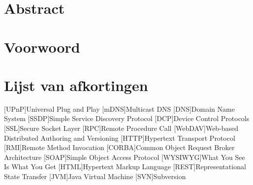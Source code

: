 %
%

\maketitle
{}


%
%

\chapter*{Abstract}
\label{chap:abstract}

%
%

\chapter*{Voorwoord}
\label{chap:voorwoord}


%
%

\setlength\cftpartnumwidth{2em}

\newpage

\label{chap:inhoudstafel}
\tableofcontents

\newpage



%
%

\listoffigures


%
%

\chapter*{Lijst van afkortingen}
\label{chap:afkortingen}

\begin{acronym}[WYSIWYG]	%

[UPnP]{Universal Plug and Play}
[mDNS]{Multicast DNS}
[DNS]{Domain Name System}
[SSDP]{Simple Service Discovery Protocol}
[DCP]{Device Control Protocols}
[SSL]{Secure Socket Layer}
[RPC]{Remote Procedure Call}
[WebDAV]{Web-based Distributed Authoring and Versioning}
[HTTP]{Hypertext Transport Protocol}
[RMI]{Remote Method Invocation}
[CORBA]{Common Object Request Broker Architecture}
[SOAP]{Simple Object Access Protocol}
[WYSIWYG]{What You See Is What You Get}
[HTML]{Hypertext Markup Language}
[REST]{Representational State Transfer}
[JVM]{Java Virtual Machine}
[SVN]{Subversion}

\end{acronym}


